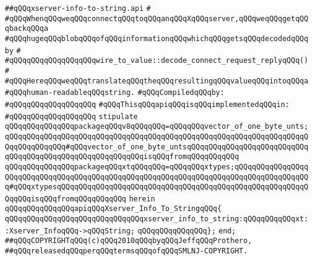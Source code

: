\label{src/lib/x-kit/xclient/src/to-string/xserver-info-to-string.api}
\verb|##qQQqxserver-info-to-string.api|\newline
\verb|#|\newline
\verb|#qQQqWhenqQQqweqQQqconnectqQQqtoqQQqanqQQqXqQQqserver,qQQqweqQQqgetqQQqbackqQQqa|\newline
\verb|#qQQqhugeqQQqblobqQQqofqQQqinformationqQQqwhichqQQqgetsqQQqdecodedqQQqby|\newline
\verb|#|\newline
\verb|#qQQqqQQqqQQqqQQqqQQqwire_to_value::decode_connect_request_replyqQQq()|\newline
\verb|#|\newline
\verb|#qQQqHereqQQqweqQQqtranslateqQQqtheqQQqresultingqQQqvalueqQQqintoqQQqa|\newline
\verb|#qQQqhuman-readableqQQqstring.|\newline
\newline
\verb|#qQQqCompiledqQQqby:|\newline
\verb|#qQQqqQQqqQQqqQQqqQQq|\newline
\newline
\verb|#qQQqThisqQQqapiqQQqisqQQqimplementedqQQqin:|\newline
\verb|#qQQqqQQqqQQqqQQqqQQq|\newline
\newline
\verb|stipulate|\newline
\verb|qQQqqQQqqQQqqQQqpackageqQQqv8qQQqqQQq=qQQqqQQqvector_of_one_byte_unts;qQQqqQQqqQQqqQQqqQQqqQQqqQQqqQQqqQQqqQQqqQQqqQQqqQQqqQQqqQQqqQQqqQQqqQQqqQQqqQQqqQQq#qQQqvector_of_one_byte_untsqQQqqQQqqQQqqQQqqQQqqQQqqQQqqQQqqQQqqQQqqQQqqQQqqQQqqQQqqQQqisqQQqfromqQQqqQQqqQQq|\newline
\verb|qQQqqQQqqQQqqQQqpackageqQQqxtqQQqqQQq=qQQqqQQqxtypes;qQQqqQQqqQQqqQQqqQQqqQQqqQQqqQQqqQQqqQQqqQQqqQQqqQQqqQQqqQQqqQQqqQQqqQQqqQQqqQQqqQQqqQQq#qQQqxtypesqQQqqQQqqQQqqQQqqQQqqQQqqQQqqQQqqQQqqQQqqQQqqQQqqQQqqQQqqQQqqQQqisqQQqfromqQQqqQQqqQQq|\newline
\verb|herein|\newline
\verb|qQQqqQQqqQQqqQQqapiqQQqXserver_Info_To_StringqQQq{|\newline
\newline
\verb|qQQqqQQqqQQqqQQqqQQqqQQqqQQqqQQqxserver_info_to_string:qQQqqQQqqQQqxt::Xserver_InfoqQQq->qQQqString;|\newline
\verb|qQQqqQQqqQQqqQQq};|\newline
\verb|end;|\newline
\newline
\verb|##qQQqCOPYRIGHTqQQq(c)qQQq2010qQQqbyqQQqJeffqQQqProthero,|\newline
\verb|##qQQqreleasedqQQqperqQQqtermsqQQqofqQQqSMLNJ-COPYRIGHT.|\newline

